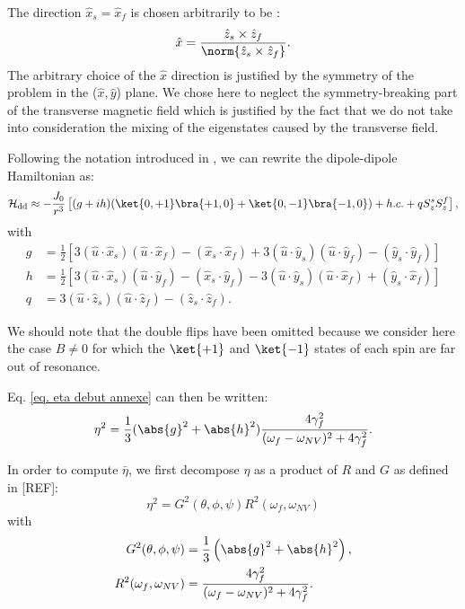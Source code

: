 \documentclass[a4paper, 11pt]{book}
\begin{document}
The direction $\hat x_s=\hat x_f$ is chosen arbitrarily to be : $$\hat x=\frac{\hat z_s \times \hat z_f}{\norm{\hat z_s \times \hat z_f}}.$$
The arbitrary choice of the $\hat x$ direction is justified by the symmetry of the problem in the ($\hat x, \hat y$) plane. We chose here to neglect the symmetry-breaking part of the transverse magnetic field which is justified by the fact that we do not take into consideration the mixing of the eigenstates caused by the transverse field.

Following the notation introduced in \citep{choi2017depolarization}, we can rewrite the dipole-dipole Hamiltonian as:
\begin{equation}
\mathcal{H}_{\rm dd} \approx -\frac{J_0}{r^3}\left[(g+ih)(\ket{0,+1}\bra{+1,0}+\ket{0,-1}\bra{-1,0}) + h.c. + q S_z^sS_z^f \right],
\end{equation}
with 
\begin{align}
g&=\frac{1}{2}\left[3(\hat{u}\cdot\hat{x}_s)(\hat{u}\cdot\hat{x}_f) - (\hat{x}_s \cdot \hat{x}_f) + 3(\hat{u}\cdot\hat{y}_s)(\hat{u}\cdot\hat{y}_f) - (\hat{y}_s \cdot \hat{y}_f) \right] \\
h&=\frac{1}{2}\left[3(\hat{u}\cdot\hat{x}_s)(\hat{u}\cdot\hat{y}_f) - (\hat{x}_s \cdot \hat{y}_f) - 3(\hat{u}\cdot\hat{y}_s)(\hat{u}\cdot\hat{x}_f) + (\hat{y}_s \cdot \hat{x}_f) \right] \\
q&= 3(\hat{u}\cdot \hat{z}_s)(\hat{u}\cdot \hat{z}_f) - (\hat{z}_s \cdot \hat{z}_f).
\end{align}

We should note that the double flips have been omitted because we consider here the case $B\neq0$ for which the $\ket{+1}$ and $\ket{-1}$ states of each spin are far out of resonance.

Eq. \ref{eq. eta debut annexe} can then be written:
\begin{equation}
\eta^2=\frac{1}{3} (\abs{g}^2 + \abs{h}^2) \frac{4\gamma_f^2}{(\omega_f - \omega_{NV})^2+4\gamma_f^2}.
\end{equation}

In order to compute $\bar \eta$, we first decompose $\eta$ as a product of $R$ and $G$ as defined in [REF]:
\begin{equation}
\eta^2=G^2(\theta, \phi, \psi) R^2(\omega_f,\omega_{NV})
\end{equation}
with
\begin{align*}
G^2(\theta, \phi, \psi)&=\frac{1}{3}\left(\abs{g}^2+\abs{h}^2 \right),  \\ 
R^2(\omega_f,\omega_{NV}) &= \frac{4\gamma_f^2}{(\omega_f - \omega_{NV})^2+4\gamma_f^2}.
\end{align*}
\end{document}
